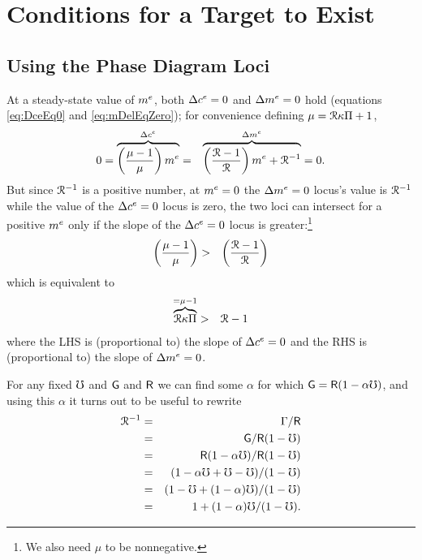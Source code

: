 \documentclass{handout}
\begin{document}
\section{Conditions for a Target to Exist}\label{sec:mTargExists}

\subsection{Using the Phase Diagram Loci} 
 
At a steady-state value of $m^{e}$, both $\Delta c^{e}=0$ and $\Delta m^{e}=0$ hold (equations \eqref{eq:DceEq0} and \eqref{eq:mDelEqZero}); for convenience defining $\mu = \mathcal{R} \kappa \Pi + 1$, 
\begin{eqnarray}
  0 = \overbrace{\left(\frac{\mu-1}{\mu}\right) m^{e}}^{\Delta c^{e} } & = & \overbrace{\left(\frac{\mathcal{R}-1}{\mathcal{R}}\right)m^{e} + \mathcal{R}^{-1}}^{\Delta m^{e}} = 0.
\end{eqnarray}
But since $\mathcal{R}^{-1}$ is a positive number, at $m^{e}=0$ the $\Delta m^{e}=0$ locus's value is $\mathcal{R}^{-1}$ while the value of the $\Delta c^{e}=0$ locus is zero, the two loci can intersect for a positive $m^{e}$ only if the slope of the $\Delta c^{e}=0$ locus is greater:\footnote{We also need $\mu$ to be nonnegative.}
\begin{eqnarray}
  \left(\frac{\mu-1}{\mu}\right) & > & \left(\frac{\mathcal{R}-1}{\mathcal{R}}\right) \label{eq:cDelEq0SlopeCond}
\end{eqnarray}
which is equivalent to 
\begin{eqnarray}
  \overbrace{\mathcal{R} \kappa \Pi}^{= \mu-1} & > &  \mathcal{R}-1  \label{eq:cDelEq0SlopeCondAlt}
\end{eqnarray}
where the LHS is (proportional to) the slope of $\Delta c^{e}=0$ and the RHS is (proportional to) the slope of $\Delta m^{e}=0$.

For any fixed $\mho$ and $\mathsf{G}$ and $\mathsf{R}$ we can find some $\alpha$ for which $\mathsf{G} = \mathsf{R} (1-\alpha \mho)$, and using this $\alpha$ it turns out to be useful to rewrite
\begin{eqnarray}
  \mathcal{R}^{-1} & = & \Gamma/\mathsf{R}
\\ & = & \mathsf{G}/\mathsf{R}(1-\mho)
\\ & = & \mathsf{R}(1-\alpha \mho)/\mathsf{R}(1-\mho)
\\ & = & (1-\alpha \mho + \mho - \mho)/(1-\mho)
\\ & = & (1-\mho+(1-\alpha) \mho)/(1-\mho)
\\ & = & 1+(1-\alpha)\mho/(1-\mho) \label{eq:RnormFromAlpha}
.
\end{eqnarray}
\end{document}
